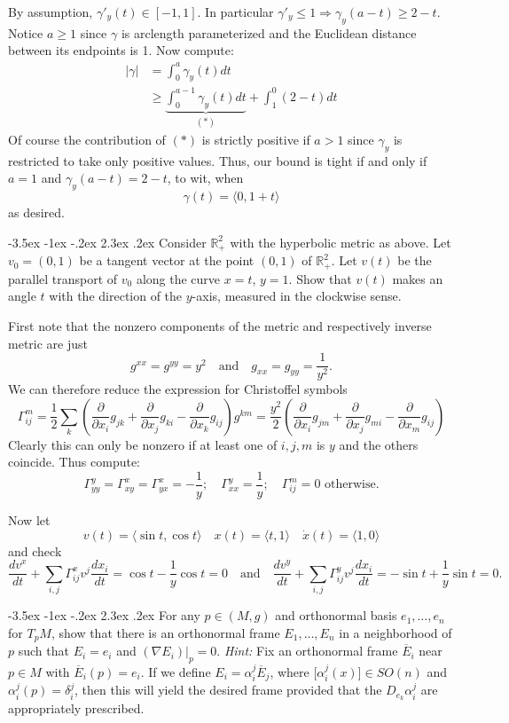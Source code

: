\documentclass[10pt]{article}
\makeatletter
\renewcommand\section{\@startsection{section}{1}{\z@}%
                                  {-3.5ex \@plus -1ex \@minus -.2ex}%
                                  {2.3ex \@plus.2ex}%
                                  {\normalfont\large\bfseries}}
\newcommand{\R}{{\ensuremath{\mathbb{R}}} }
\newcommand{\del}{{\ensuremath{\partial}} }
\newcommand{\xt}[2]{\ensuremath{\Gamma^{#1}_{#2}}}
\newcommand{\hint}[1]{{\emph{Hint:} #1}} %
\makeatother
\begin{document}
By assumption, $\gamma'_y(t) \in [-1,1]$. In particular $\gamma'_y \leq 1 \Rightarrow \gamma_y(a-t) \geq 2 -t$. Notice $a \geq 1$ since $\gamma$ is arclength parameterized and the Euclidean distance between its endpoints is 1. Now compute:
\begin{align*}|\gamma| &=  \int_0^a \gamma_y(t) dt \\ & \geq \underbrace{\int_0^{a-1}\gamma_y(t) dt}_{(*)} + \int_1^0(  2-t ) dt  \end{align*}
Of course the contribution of $(*)$ is strictly positive if $a >1$ since $\gamma_y$ is restricted to take only positive values. Thus, our bound is tight if and only if $a = 1$ and $\gamma_y(a-t) = 2- t$, to wit, when
\[\gamma(t) =  \langle 0, 1 +t \rangle\]
as desired.

\section{Consider $\R_+^2$ with the hyperbolic metric as above. Let $v_0 = (0,1)$ be a tangent vector at the point $(0,1)$ of $\R_+^2$. Let $v(t)$ be the parallel transport of $v_0$ along the curve $x=t$, $y=1$. Show that $v(t)$ makes an angle $t$ with the direction of the $y$-axis, measured in the clockwise sense.}

First note that the nonzero components of the metric and respectively inverse metric are just
\[ g^{xx} = g^{yy} = y^2 \quad \mbox{and} \quad g_{xx} = g_{yy} = \frac{1}{y^2}.\]
We can therefore reduce the expression for Christoffel symbols
\[ \xt{m}{ij} = \frac{1}{2} \sum_k \left( \frac{\del}{\del x_i } g_{jk} + \frac{\del}{\del x_j}g_{ki} - \frac{\del}{\del x_k} g_{ij} \right) g^{km} = \frac{y^2}{2}  \left( \frac{\del}{\del x_i } g_{jm} + \frac{\del}{\del x_j}g_{mi} - \frac{\del}{\del x_m} g_{ij} \right)\]
Clearly this can only be nonzero if at least one of $i,j,m$ is $y$ and the others coincide. Thus compute:
\[\xt{y}{yy} =\xt{x}{xy} =\xt{x}{yx} = - \frac{1}{y}; \quad \xt{y}{xx} = \frac{1}{y}; \quad \xt{m}{ij} = 0   \mbox{ otherwise} .\]

Now let 
\[v(t) = \langle \sin t, \cos t \rangle \quad x(t) = \langle t, 1 \rangle \quad \dot{x}(t) =\langle 1 , 0 \rangle \]
and check
\[\frac{dv^x}{dt } + \sum_{i,j} \xt{x}{ij} v^j \frac{dx_i}{dt} = \cos t - \frac{1}{y} \cos t = 0 \quad \mbox{and} \quad\frac{dv^y}{dt } + \sum_{i,j} \xt{y}{ij} v^j \frac{dx_i}{dt} = - \sin t + \frac{1}{y} \sin t=0.\]

\section{For any $p \in (M,g)$ and orthonormal basis $e_1, \dots, e_n$ for $T_p M$, show that there is an orthonormal frame $E_1, \dots, E_n$ in a neighborhood of $p$ such that $E_i = e_i$ and $(\nabla E_i)|_p = 0 $. \hint{Fix an orthonormal frame $\overline{E}_i$ near $p \in M$ with $\overline{E}_i(p) = e_i$. If we define $E_i = \alpha_i^j \overline{E}_j$, where [$\alpha_i^j (x)$]$\in SO(n)$ and $\alpha_i^j(p) = \delta_i^j$, then this will yield the desired frame provided that the $D_{e_k} \alpha_i^j$ are appropriately prescribed. }}
\end{document}
